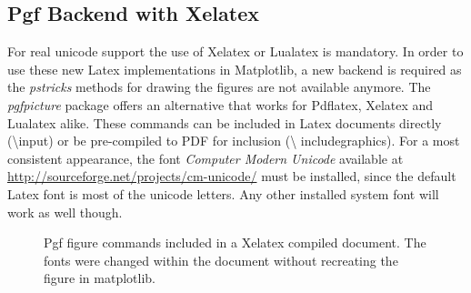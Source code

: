 \documentclass[12pt, a4paper]{article}
\begin{document}
\newpage
\subsection*{Pgf Backend with Xelatex}

For real unicode support the use of Xelatex or Lualatex is mandatory. In order to use these new Latex implementations in Matplotlib, a new backend is required as the \textit{pstricks} methods for drawing the figures are not available anymore. The \textit{pgfpicture} package offers an alternative that works for Pdflatex, Xelatex and Lualatex alike. These commands can be included in Latex documents directly (\textbackslash input) or be pre-compiled to PDF for inclusion (\textbackslash
 includegraphics). For a most consistent appearance, the font \textit{Computer Modern Unicode} available at \url{http://sourceforge.net/projects/cm-unicode/} must be installed, since the default Latex font is most of the unicode letters. Any other installed system font will work as well though.

\begin{figure}[h]
\hspace{1mm}
\caption{Pgf figure commands included in a Xelatex compiled document. The fonts were changed within the document without recreating the figure in matplotlib.}
\end{figure}
\end{document}
